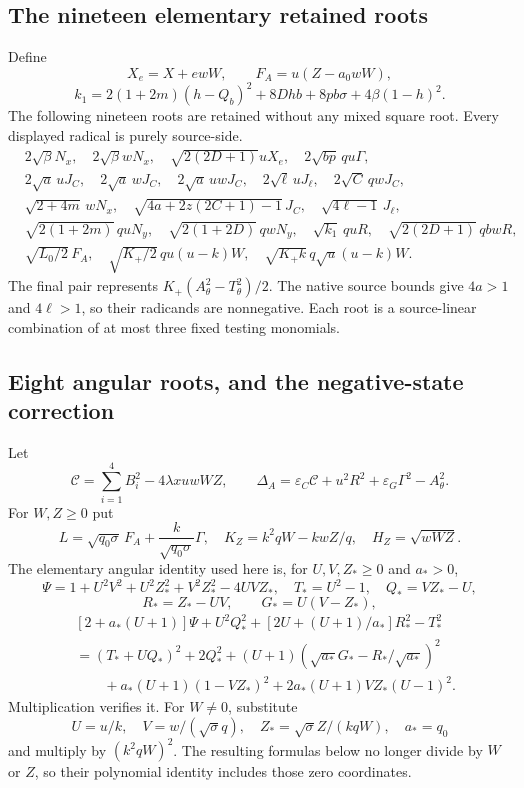 \subsection{The nineteen elementary retained roots}

Define
\[
 X_e=X+ewW,\qquad F_A=u(Z-a_0wW),
\]
\[
 k_1=2(1+2m)(h-Q_b)^2+8Dhb+8pb\sigma+4\beta(1-h)^2.
\]
The following nineteen roots are retained without any mixed square
root. Every displayed radical is purely source-side.
\begin{align*}
 &2\sqrt\beta N_x,\quad2\sqrt\beta wN_x,
 \quad\sqrt{2(2D+1)}uX_e,\quad2\sqrt{bp}\,qu\Gamma,\\
 &2\sqrt a\,uJ_C,\quad2\sqrt a\,wJ_C,
 \quad2\sqrt a\,uwJ_C,\quad2\sqrt\ell\,uJ_\ell,
 \quad2\sqrt C\,qwJ_C,\\
 &\sqrt{2+4m}\,wN_x,\quad
 \sqrt{4a+2z(2C+1)-1}\,J_C,\quad\sqrt{4\ell-1}\,J_\ell,\\
 &\sqrt{2(1+2m)}\,quN_y,\quad
 \sqrt{2(1+2D)}\,qwN_y,\quad
 \sqrt{k_1}\,quR,\quad\sqrt{2(2D+1)}\,qbwR,\\
 &\sqrt{L_0/2}\,F_A,\quad
 \sqrt{K_+/2}\,qu(u-k)W,\quad
 \sqrt{K_+k}\,q\sqrt u(u-k)W.
\end{align*}
The final pair represents $K_+(A_\theta^2-T_\theta^2)/2$.
The native source bounds give $4a>1$ and $4\ell>1$, so their
radicands are nonnegative. Each root is a source-linear combination
of at most three fixed testing monomials.

\subsection{Eight angular roots, and the negative-state correction}

Let
\[
 \mathscr C=\sum_{i=1}^4B_i^2-4\lambda xuwWZ,
 \qquad
 \Delta_A=\varepsilon_C\mathscr C+u^2R^2
                   +\varepsilon_G\Gamma^2-A_\theta^2.
\]
For $W,Z\ge0$ put
\[
 L=\sqrt{q_0\sigma}\,F_A+\frac{k}{\sqrt{q_0\sigma}}\Gamma,
 \quad K_Z=k^2qW-kwZ/q,\quad H_Z=\sqrt{wWZ}.
\]
The elementary angular identity used here is, for $U,V,Z_*\ge0$
and $a_*>0$,
\[
 \Psi=1+U^2V^2+U^2Z_*^2+V^2Z_*^2-4UVZ_*,
 \quad T_*=U^2-1,\quad Q_*=VZ_*-U,
\]
\[
 R_*=Z_*-UV,\qquad G_*=U(V-Z_*),
\]
\begin{align*}
 &[2+a_*(U+1)]\Psi+U^2Q_*^2+
       [2U+(U+1)/a_*]R_*^2-T_*^2\\
 &=(T_*+UQ_*)^2+2Q_*^2
       +(U+1)(\sqrt{a_*}G_*-R_*/\sqrt{a_*})^2\\
 &\qquad+a_*(U+1)(1-VZ_*)^2+
                  2a_*(U+1)VZ_*(U-1)^2 .
 \tag{US}
\end{align*}
Multiplication verifies it. For $W\ne0$, substitute
\[
 U=u/k,\quad V=w/(\sqrt{\sigma}q),\quad
 Z_*=\sqrt{\sigma}Z/(kqW),\quad a_*=q_0
\]
and multiply by $(k^2qW)^2$. The resulting formulas below no longer
divide by $W$ or $Z$, so their polynomial identity includes those
zero coordinates.

